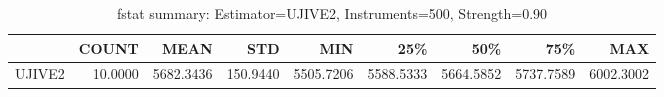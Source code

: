 \begin{table}[ht]
\centering
\caption{fstat summary: Estimator=UJIVE2, Instruments=500, Strength=0.90}
\begin{tabular}{lrrrrrrrr}
\toprule
 & COUNT & MEAN & STD & MIN & 25\% & 50\% & 75\% & MAX \\
\midrule
UJIVE2 & 10.0000 & 5682.3436 & 150.9440 & 5505.7206 & 5588.5333 & 5664.5852 & 5737.7589 & 6002.3002 \\
\bottomrule
\end{tabular}
\end{table}
